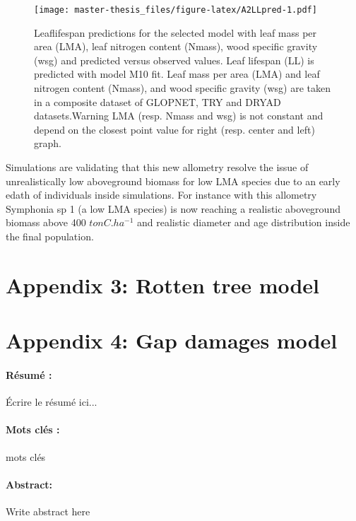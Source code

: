 \documentclass[12pt,]{article}
\let\oldsection\section
\renewcommand\section{\newpage\oldsection}
\theoremstyle{definition}
\theoremstyle{definition}
\theoremstyle{remark}
\begin{document}
\begin{figure}[htbp]
\centering
\texttt{[image: master-thesis\_files/figure-latex/A2LLpred-1.pdf]}
\caption{\label{fig:A2LLpred}Leaflifespan predictions for the selected model
with leaf mass per area (LMA), leaf nitrogen content (Nmass), wood
specific gravity (wsg) and predicted versus observed values. Leaf
lifespan (LL) is predicted with model M10 fit. Leaf mass per area (LMA)
and leaf nitrogen content (Nmass), and wood specific gravity (wsg) are
taken in a composite dataset of GLOPNET, TRY and DRYAD datasets.Warning
LMA (resp. Nmass and wsg) is not constant and depend on the closest
point value for right (resp. center and left) graph.}
\end{figure}

Simulations are validating that this new allometry resolve the issue of
unrealistically low aboveground biomass for low LMA species due to an
early edath of individuals inside simulations. For instance with this
allometry Symphonia sp 1 (a low LMA species) is now reaching a realistic
aboveground biomass above 400 \(tonC.ha^{-1}\) and realistic diameter
and age distribution inside the final population.

\hypertarget{appendix-3-rotten-tree-model}{\section{Appendix 3: Rotten
tree model}\label{appendix-3-rotten-tree-model}}

\hypertarget{appendix-4-gap-damages-model}{\section{Appendix 4: Gap
damages model}\label{appendix-4-gap-damages-model}}


\listoftables
\listoffigures

  \newpage
  \paragraph{Résumé :}
  Écrire le résumé ici...
  \paragraph{Mots clés :} mots clés
  \newline\newline
  \paragraph{Abstract:}
  Write abstract here
\end{document}
